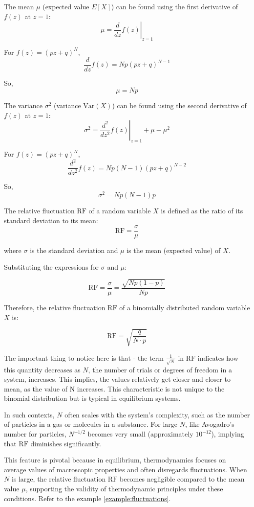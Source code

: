 The mean \( \mu \) (expected value \( E[X] \)) can be found using the first derivative of \( f(z) \) at \( z = 1 \):
\[ \mu = \left. \frac{d}{dz} f(z) \right|_{z=1} \]

For \( f(z) = (pz + q)^N \),
\[ \frac{d}{dz} f(z) = Np(pz + q)^{N-1} \]

So,
\[ \mu = Np \]

The variance \( \sigma^2 \) (variance \( \text{Var}(X) \)) can be found using the second derivative of \( f(z) \) at \( z = 1 \):
\[ \sigma^2 = \left. \frac{d^2}{dz^2} f(z) \right|_{z=1} + \mu - \mu^2 \]

For \( f(z) = (pz + q)^N \),
\[ \frac{d^2}{dz^2} f(z) = Np(N-1)(pz + q)^{N-2} \]

So,
\[ \sigma^2 = Np(N-1)p \]


\begin{definition}
    The relative fluctuation \( \text{RF} \) of a random variable \( X \) is defined as the ratio of its standard deviation to its mean:
    \[ \text{RF} = \frac{\sigma}{\mu} \]

    where \( \sigma \) is the standard deviation and \( \mu \) is the mean (expected value) of \( X \).
\end{definition}

Substituting the expressions for \( \sigma \) and \( \mu \):

\[ \text{RF} = \frac{\sigma}{\mu} = \frac{\sqrt{Np(1-p)}}{Np} \]

Therefore, the relative fluctuation \( \text{RF} \) of a binomially distributed random variable \( X \) is:

\[ \text{RF} = \sqrt{\frac{{q}}{N \cdot p}} \]

The important thing to notice here is that - the term \( \frac{1}{\sqrt{N}} \) in \( \text{RF} \) indicates how this quantity decreases as \( N \), the number of trials or degrees of freedom in a system, increases. This implies, the values relatively get closer and closer to mean, as the value of N increases. This characteristic is not unique to the binomial distribution but is typical in equilibrium systems.

In such contexts, \( N \) often scales with the system's complexity, such as the number of particles in a gas or molecules in a substance. For large \( N \), like Avogadro's number for particles, \( N^{-1/2} \) becomes very small (approximately \( 10^{-12} \)), implying that \( \text{RF} \) diminishes significantly.

This feature is pivotal because in equilibrium, thermodynamics focuses on average values of macroscopic properties and often disregards fluctuations. When \( N \) is large, the relative fluctuation \( \text{RF} \) becomes negligible compared to the mean value \( \mu \), supporting the validity of thermodynamic principles under these conditions. Refer to the example \ref{example:fluctuations}.

